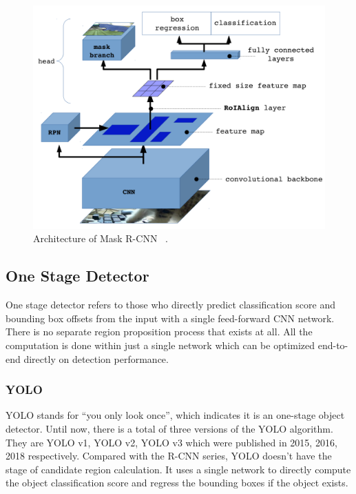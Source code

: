 \begin{figure}
    \begin{center}
    \includegraphics[scale=0.5]{figures/mask_r_cnn.png}
    \end{center}
    \caption{Architecture of Mask R-CNN ~\protect\cite{mask-r-cnn-slide}.}
    \label{fig:mask-r-cnn}
\end{figure}


\subsection{One Stage Detector}
\label{sec:related-worked-one-stage-detector}

One stage detector refers to those who directly predict classification score and bounding
box offsets from the input with a single feed-forward CNN network. There is no
separate region proposition process that exists at all. All the computation is done
within just a single network which can be optimized end-to-end directly on
detection performance.

\subsubsection{YOLO}
\label{sec:related-worked-yolo}

YOLO stands for ``you only look once'', which indicates it is an one-stage
object detector. Until now, there is a total of 
three versions of the YOLO algorithm. They are YOLO v1, YOLO v2, YOLO v3 which 
were published in 2015, 2016, 2018 respectively. 
Compared with the R-CNN series, YOLO doesn't have the stage of 
candidate region calculation. It uses a single network to
directly compute the object classification score and regress the bounding
boxes if the object exists.

